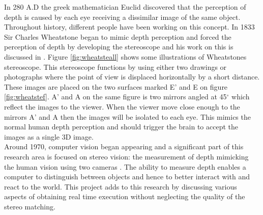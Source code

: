 In 280 A.D the greek mathematician Euclid discovered that the perception of depth is caused by each eye receiving a dissimilar image of the same object. Throughout history, different people have been working on this concept. In 1833 Sir Charles Wheatstone began to mimic depth perception and forced the perception of depth by developing the stereoscope and his work on this is discussed in \cite{wheatstone1838contributions}. Figure \vref{fig:wheatsteall} shows some illustrations of Wheatstones stereoscope. This stereoscope functions by using either two drawings or photographs where the point of view is displaced horizontally by a short distance. These images are placed on the two surfaces marked E' and E on figure \vref{fig:wheatstef}. A' and A on the same figure is two mirrors angled at 45$^{\circ}$ which reflect the images to the viewer. When the viewer move close enough to the mirrors A' and A then the images will be isolated to each eye. This mimics the normal human depth perception and should trigger the brain to accept the images as a single 3D image. \cite{lit:historyofstereophoto}\\

Around 1970, computer vision began appearing and a significant part of this research area is focused on stereo vision: the measurement of depth mimicking the human vision using two cameras \cite{Szeliski2010}. The ability to measure depth enables a computer to distinguish between objects and hence to better interact with and react to the world. This project adds to this research by discussing various aspects of obtaining real time execution without neglecting the quality of the stereo matching.\\

